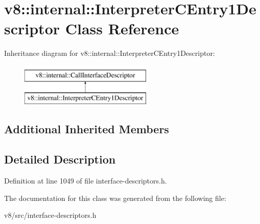 \hypertarget{classv8_1_1internal_1_1InterpreterCEntry1Descriptor}{}\section{v8\+:\+:internal\+:\+:Interpreter\+C\+Entry1\+Descriptor Class Reference}
\label{classv8_1_1internal_1_1InterpreterCEntry1Descriptor}
Inheritance diagram for v8\+:\+:internal\+:\+:Interpreter\+C\+Entry1\+Descriptor\+:\begin{figure}[H]
\begin{center}
\leavevmode
\includegraphics[height=2.000000cm]{classv8_1_1internal_1_1InterpreterCEntry1Descriptor}
\end{center}
\end{figure}
\subsection*{Additional Inherited Members}


\subsection{Detailed Description}


Definition at line 1049 of file interface-\/descriptors.\+h.



The documentation for this class was generated from the following file\+:\begin{DoxyCompactItemize}
\item 
v8/src/interface-\/descriptors.\+h\end{DoxyCompactItemize}
